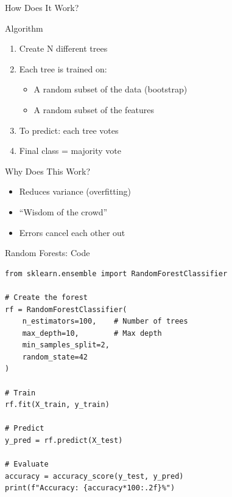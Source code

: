 \documentclass[aspectratio=169]{beamer}
\begin{document}
\begin{frame}{How Does It Work?}
\begin{block}{Algorithm}
\begin{enumerate}
    \item Create N different trees
    \item Each tree is trained on:
    \begin{itemize}
        \item A random subset of the data (bootstrap)
        \item A random subset of the features
    \end{itemize}
    \item To predict: each tree votes
    \item Final class = majority vote
\end{enumerate}
\end{block}

\vspace{0.3cm}
\begin{alertblock}{Why Does This Work?}
\begin{itemize}
    \item Reduces variance (overfitting)
    \item ``Wisdom of the crowd''
    \item Errors cancel each other out
\end{itemize}
\end{alertblock}
\end{frame}

\begin{frame}[fragile]{Random Forests: Code}
\begin{lstlisting}
from sklearn.ensemble import RandomForestClassifier

# Create the forest
rf = RandomForestClassifier(
    n_estimators=100,    # Number of trees
    max_depth=10,        # Max depth
    min_samples_split=2,
    random_state=42
)

# Train
rf.fit(X_train, y_train)

# Predict
y_pred = rf.predict(X_test)

# Evaluate
accuracy = accuracy_score(y_test, y_pred)
print(f"Accuracy: {accuracy*100:.2f}%")
\end{lstlisting}
\end{frame}
\end{document}
